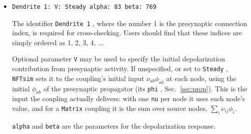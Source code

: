 \documentclass[12pt,a4paper]{article}
\newcommand{\type}[1]{{\small\small\tt #1} }
\newcommand{\NF}[0]{\type{NFTsim}}
\begin{document}
\begin{description}
\begin{itemize}
    Alternatively, you can specify a linear, quadratic or cubic firing response,
    \begin{lstlisting}
Firing: Function: Linear a: 1 b: 1
Firing: Function: Quadratic a: 1 b: 1 c: 0
Firing: Function: Cubic a: 1 b: 1 c: 0 d: 0
    \end{lstlisting}
    which give \(Q = aV + b\), \(Q = aV^2 + bV + c\) and \(Q = aV^3 + bV^2 + cV + d\), respectively.
    Any other \type{Function} name is an error.

    \item
    \begin{lstlisting}
Dendrite 1: V: Steady alpha: 83 beta: 769
    \end{lstlisting}
    The identifier \type{Dendrite 1}, where the number 1 is the presynaptic connection index, is required for cross-checking. Users should find that these indices are simply ordered as 1, 2, 3, 4, ...

    Optional parameter \type{V} may be used to specify the initial depolarization contribution from presynaptic activity. If unspecified, or set to \type{Steady}, \NF sets it to the coupling's initial input \(\nu_{ab}\phi_{ab}\) at each node, using the initial \(\phi_{ab}\) of the presynaptic propagator (its \type{phi}, Sec.~\ref{sec:prop}).
    This is the input the coupling actually delivers: with one \type{nu} per node it uses each node's value, and for a \type{Matrix} coupling it is the sum over source nodes, \(\sum_i \nu_{ij}\phi_i\).

    \type{alpha} and \type{beta} are the parameters for the depolarization response.
    \end{itemize}
\end{description}
\end{document}
